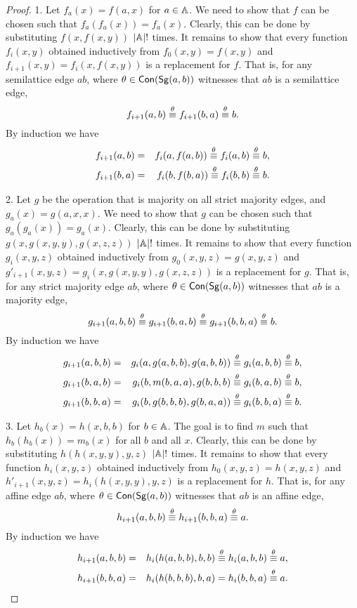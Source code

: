 \documentclass[11pt]{article}
\begin{document}
\begin{proof}
1. Let $f_a(x)=f(a,x)$ for $a\in {\mathbb A}$. We need to show that $f$ can be chosen such 
that $f_a(f_a(x))=f_a(x)$. Clearly, this can be done by substituting $f(x,f(x,y))$ 
$|{\mathbb A}|!$ times. It remains to show that every function $f_i(x,y)$ obtained inductively 
from $f_0(x,y)=f(x,y)$ and $f_{i+1}(x,y)=f_i(x,f(x,y))$ is a replacement for $f$. 
That is, for any semilattice edge $ab$, where $\theta\in{\sf Con}({\sf Sg}(a,b))$ witnesses that $ab$ 
is a semilattice edge,
$$
f_{i+1}(a,b)\stackrel{\theta}{\equiv} f_{i+1}(b,a)\stackrel{\theta}{\equiv} b.
$$
By induction we have 
\begin{eqnarray*}
f_{i+1}(a,b) &=& f_i(a,f(a,b))\stackrel{\theta}{\equiv} f_i(a,b)\stackrel{\theta}{\equiv} b,\\
f_{i+1}(b,a) &=& f_i(b,f(b,a))\stackrel{\theta}{\equiv} f_i(b,b)\stackrel{\theta}{\equiv} b.
\end{eqnarray*}

2. Let $g$ be the operation that is majority on all strict majority edges, and $g_a(x)=g(a,x,x)$. 
We need to show that $g$ can be chosen such that $g_a(g_a(x))=g_a(x)$. Clearly, this 
can be done by substituting $g(x,g(x,y,y),g(x,z,z))$ $|{\mathbb A}|!$ times. It remains to show 
that every function $g_i(x,y,z)$ obtained inductively from $g_0(x,y,z)=g(x,y,z)$ and 
$g'_{i+1}(x,y,z)=g_i(x,g(x,y,y),g(x,z,z))$ is a replacement for $g$. That is, for any 
strict majority edge $ab$, where $\theta\in{\sf Con}({\sf Sg}(a,b))$ witnesses that $ab$ is a 
majority edge,
$$
g_{i+1}(a,b,b)\stackrel{\theta}{\equiv} g_{i+1}(b,a,b)\stackrel{\theta}{\equiv} g_{i+1}(b,b,a)\stackrel{\theta}{\equiv} b.
$$
By induction we have 
\begin{eqnarray*}
g_{i+1}(a,b,b) &=& g_i(a,g(a,b,b),g(a,b,b))\stackrel{\theta}{\equiv} g_i(a,b,b)\stackrel{\theta}{\equiv} b,\\
g_{i+1}(b,a,b) &=& g_i(b,m(b,a,a),g(b,b,b)\stackrel{\theta}{\equiv} g_i(b,a,b)\stackrel{\theta}{\equiv} b,\\
g_{i+1}(b,b,a) &=& g_i(b,g(b,b,b),g(b,a,a)) \stackrel{\theta}{\equiv} g_i(b,b,a)\stackrel{\theta}{\equiv} b.
\end{eqnarray*}

3. Let $h_b(x)=h(x,b,b)$ for $b\in{\mathbb A}$. The goal is to find $m$ such that 
$h_b(h_b(x))=m_b(x)$ for 
all $b$ and all $x$. Clearly, this can be done by substituting $h(h(x,y,y),y,z)$ 
$|{\mathbb A}|!$ times. It remains to show that every function $h_i(x,y,z)$ obtained 
inductively from $h_0(x,y,z)=h(x,y,z)$ and $h'_{i+1}(x,y,z)=h_i(h(x,y,y),y,z)$ 
is a replacement for $h$. That is, for any affine edge $ab$, 
where $\theta\in{\sf Con}({\sf Sg}(a,b))$ witnesses that $ab$ is an affine edge,
$$
h_{i+1}(a,b,b)\stackrel{\theta}{\equiv} h_{i+1}(b,b,a)\stackrel{\theta}{\equiv} a.
$$
By induction we have 
\begin{eqnarray*}
h_{i+1}(a,b,b) &=& h_i(h(a,b,b),b,b)\stackrel{\theta}{\equiv} h_i(a,b,b)\stackrel{\theta}{\equiv} a,\\
h_{i+1}(b,b,a) &=& h_i(h(b,b,b),b,a) = h_i(b,b,a)\stackrel{\theta}{\equiv} a.
\end{eqnarray*}
\end{proof}
\end{document}
